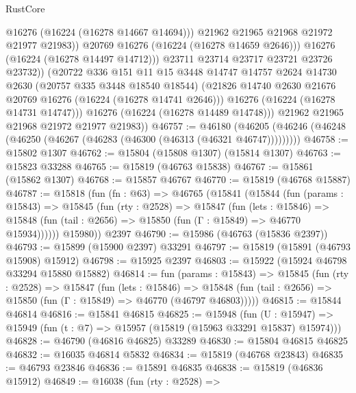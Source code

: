 \begin{lexlean}{RustCore}
\begin{coremodule}
                        @16276
                        (@16224 (@16278 @14667 @14694)))
                      @21962
                      @21965
                      @21968
                      @21972
                      @21977
                      @21983))
                  @20769
                  @16276
                  (@16224 (@16278 @14659 @2646)))
                @16276
                (@16224 (@16278 @14497 @14712)))
              @23711
              @23714
              @23717
              @23721
              @23726
              @23732))
          (@20722
            @336
            @151
            @11
            @15
            @3448
            @14747
            @14757
            @2624
            @14730
            @2630
            (@20757 @335 @3448 @18540 @18544)
            (@21826 @14740 @2630 @21676 @20769 @16276 (@16224 (@16278 @14741 @2646)))
            @16276
            (@16224 (@16278 @14731 @14747)))
          @16276
          (@16224 (@16278 @14489 @14748)))
        @21962
        @21965
        @21968
        @21972
        @21977
        @21983))
@46757 := @46180
    (@46205 (@46246 (@46248 (@46250 (@46267 (@46283 (@46300 (@46313 (@46321 @46747)))))))))
@46758 := @15802 @1307
@46762 := @15804 (@15808 @1307) (@15814 @1307)
@46763 := @15823 @33288
@46765 := @15819 (@46763 @15838)
@46767 := @15861 (@15862 @1307)
@46768 := @15857 @46767
@46770 := @15819 (@46768 @15887)
@46787 := @15818
    (fun (fn : @63) =>
    @46765
      (@15841
        (@15844
          (fun (params : @15843) =>
          @15845
            (fun (rty : @2528) =>
            @15847
              (fun (lets : @15846) =>
              @15848 (fun (tail : @2656) => @15850 (fun (Γ : @15849) => @46770 @15934))))))
        @15980))
    @2397
@46790 := @15986 (@46763 (@15836 @2397))
@46793 := @15899 (@15900 @2397) @33291
@46797 := @15819 (@15891 (@46793 @15908) @15912)
@46798 := @15925 @2397
@46803 := @15922 (@15924 @46798 @33294 @15880 @15882)
@46814 := fun (params : @15843) =>
  @15845
    (fun (rty : @2528) =>
    @15847
      (fun (lets : @15846) =>
      @15848 (fun (tail : @2656) => @15850 (fun (Γ : @15849) => @46770 (@46797 @46803)))))
@46815 := @15844 @46814
@46816 := @15841 @46815
@46825 := @15948
    (fun (U : @15947) => @15949 (fun (t : @7) => @15957 (@15819 (@15963 @33291 @15837) @15974)))
@46828 := @46790 (@46816 @46825) @33289
@46830 := @15804 @46815 @46825
@46832 := @16035 @46814 @5832
@46834 := @15819 (@46768 @23843)
@46835 := @46793 @23846
@46836 := @15891 @46835
@46838 := @15819 (@46836 @15912)
@46849 := @16038
    (fun (rty : @2528) =>

\end{coremodule}
\end{lexlean}
